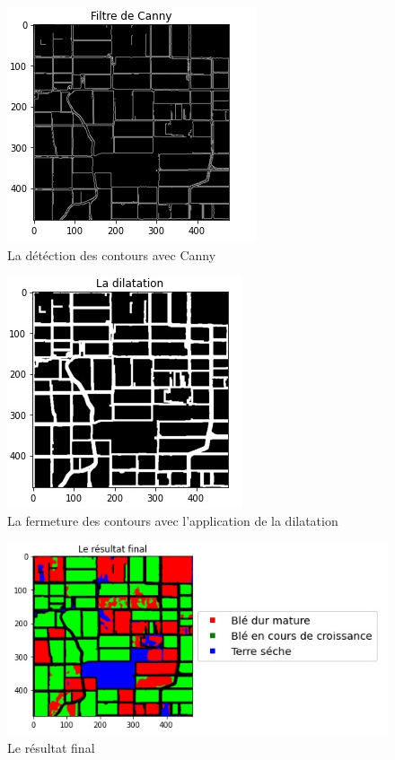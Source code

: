 \documentclass[12pt, openany]{report}
\begin{document}
\begin{figure}[H]
\centering
\includegraphics[scale=1]{canny.jpg}
\caption{La détéction des contours avec Canny}
\end{figure}

\begin{figure}[H]
\centering
\includegraphics[scale=1]{dilation.jpg}
\caption{La fermeture des contours avec l'application de la dilatation}
\end{figure}

\begin{figure}[H]
\centering
\includegraphics[scale=1]{final.jpg}
\caption{Le résultat final}
\end{figure}
\end{document}
